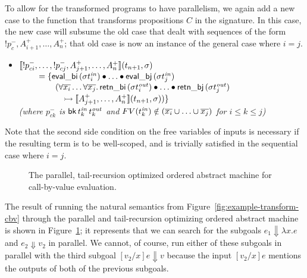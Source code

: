 To allow for the transformed programs to have parallelism, we again
add a new case to the function that transforms propositions $C$ in the
signature.  In this case, the new case will subsume the old
case that dealt with sequences of the form ${!}p_c^-,
A^+_{i+1},\ldots,A^+_n$; that old case is now an instance of the
general case where $i = j$. 

\begin{itemize}
\item $\llbracket {{!}p^-_{ci},\ldots,{!}p^-_{cj},A^+_{j+1},\ldots,A^+_n} \rrbracket({t_{n+1}},{\sigma})$
  \\
  $~ \qquad = \{ {\sf eval\_bi}\,({\sigma}t^{\it in}_i) 
                    \mathbin{\bullet} \ldots \mathbin{\bullet}
                 {\sf eval\_bj}\,({\sigma}t^{\it in}_j)$
  \\
  $~ \qquad \qquad (\forall\overline{x_i}\ldots\forall\overline{x_j}.\, 
     {\sf retn\_bi}\,(\sigma{t^{\it out}_i})
     \mathbin{\bullet} \ldots \mathbin{\bullet} 
     {\sf retn\_bj}\,(\sigma{t^{\it out}_j})$
  \\
  $~ \qquad \qquad \quad
   \rightarrowtail \llbracket {A^+_{j+1},\ldots,A^+_n} \rrbracket({t_{n+1}},{\sigma})) \}$\\
  {\it (where
   $p^-_{ck}$ is ${\sf bk}\,t^{\it in}_k\,t^{\it out}_k$ 
   and $FV(t_k^{\it in}) \notin (\overline{x_i} \cup \ldots \cup \overline{x_j})$ 
   for $i \leq k \leq j$)}
\end{itemize}

\noindent
Note that the second side condition on the free variables of inputs is
necessary if the resulting term is to be well-scoped, and is trivially 
satisfied in the sequential case where $i = j$. 

\begin{figure}
\caption{The parallel, tail-recursion optimized ordered abstract machine for
 call-by-value evaluation.}
\label{fig:cbv-ev-ssos-par}
\end{figure}

The result of running the natural semantics from
Figure~\ref{fig:example-transform-cbv} through the parallel and
tail-recursion optimizing ordered abstract machine is shown in
Figure~\ref{fig:cbv-ev-ssos-par}; it represents that we can
search for the subgoals $e_1 \Downarrow \lambda x.e$ and
$e_2 \Downarrow v_2$ in parallel. We cannot, of course, run either
of these subgoals in parallel with the third subgoal 
$[v_2/x]e \Downarrow v$ because the input $[v_2/x]e$ mentions the outputs
of both of the previous subgoals. 

